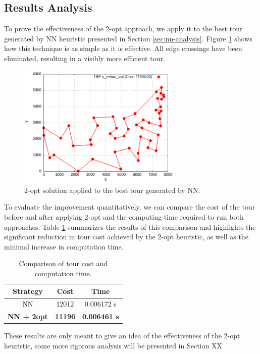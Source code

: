 \subsection{Results Analysis}
To prove the effectiveness of the 2-opt approach, we apply it to the best tour generated by NN heuristic presented in Section \ref{sec:nn-analysis}.
Figure \ref{fig:nn-2opt-example} shows how this technique is as simple as it is effective. All edge crossings have been eliminated, resulting in a visibly more efficient tour.

\begin{figure}[h!]
    \centering
    \includegraphics[width=0.7\textwidth]{images/TSP_n_n+two_opt.png}
    \caption{2-opt solution applied to the best tour generated by NN.}
    \label{fig:nn-2opt-example}
\end{figure}

To evaluate the improvement quantitatively, we can compare the cost of the tour before and after applying 2-opt and the computing time required to run both approaches. Table \ref{tab:nn-vs-2opt} summarizes the results of this comparison and highlights the significant reduction in tour cost achieved by the 2-opt heuristic, as well as the minimal increase in computation time.

\begin{table}[h!]
    \centering
    \caption{Comparison of tour cost and computation time.}
    \begin{tabular}{|c|c|c|}
        \hline
        Strategy & Cost & Time \\
        \hline
        NN        & 12012 & 0.006172 s \\
        \textbf{NN + 2opt} & \textbf{11196} & \textbf{0.006461 s} \\
        \hline
    \end{tabular}
    \label{tab:nn-vs-2opt}
\end{table}

These results are only meant to give an idea of the effectiveness of the 2-opt heuristic, some more rigorous analysis will be presented in Section XX 
